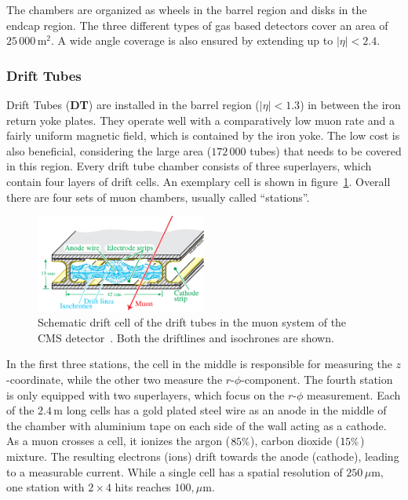 The chambers are organized as wheels in the barrel region and disks in the endcap region. The three different types of gas based detectors cover an area of $25\,000\,\text{m}^2$. A wide angle coverage is also ensured by extending up to $|\eta| < 2.4$.

\subsubsection{Drift Tubes}
\label{sec:drift-tubes}

Drift Tubes (\textbf{DT}) are installed in the barrel region ($|\eta| < 1.3$) in between the iron return yoke plates. They operate well with a comparatively low muon rate and a fairly uniform magnetic field, which is contained by the iron yoke. The low cost is also beneficial, considering the large area ($172\,000$ tubes) that needs to be covered in this region. Every drift tube chamber consists of three superlayers, which contain four layers of drift cells. An exemplary cell is shown in figure~\ref{fig:drift-cell}. Overall there are four sets of muon chambers, usually called ``stations''.

\begin{figure}[!htb]
  \centering
  \includegraphics[width=0.5\textwidth]{plots/driftcell.pdf}  
  \caption{Schematic drift cell of the drift tubes in the muon system of the CMS detector~\cite{driftcell}. Both the driftlines and isochrones are shown.}
  \label{fig:drift-cell}
\end{figure}

In the first three stations, the cell in the middle is responsible for measuring the $z$-coordinate, while the other two measure the $r$-$\phi$-component. The fourth station is only equipped with two superlayers, which focus on the $r$-$\phi$ measurement. Each of the $2.4\,\text{m}$ long cells has a gold plated steel wire as an anode in the middle of the chamber with aluminium tape on each side of the wall acting as a cathode. As a muon crosses a cell, it ionizes the argon ($85\pct$), carbon dioxide ($15\pct$) mixture. The resulting electrons (ions) drift towards the anode (cathode), leading to a measurable current. While a single cell has a spatial resolution of $250\,\mu\text{m}$, one station with $2 \times 4$ hits reaches $100,\mu\text{m}$.

